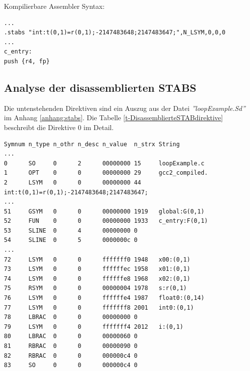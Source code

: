 Kompilierbare Assembler Syntax:
\lstset{language=plain}
\begin{lstlisting}
...
.stabs "int:t(0,1)=r(0,1);-2147483648;2147483647;",N_LSYM,0,0,0
...
c_entry:
push {r4, fp}
\end{lstlisting}


\subsection{Analyse der disassemblierten STABS}
\FloatBarrier

Die untenstehenden Direktiven sind ein Auszug aus der Datei \textit{''loopExample.Sd''} im Anhang \ref{anhang:stabs}.
Die Tabelle \ref{t-DisassemblierteSTABdirektive} beschreibt die Direktive 0 im Detail.
\lstset{language=plain}
\begin{lstlisting}
Symnum n_type n_othr n_desc n_value  n_strx String
...
0      SO     0      2      00000000 15     loopExample.c
1      OPT    0      0      00000000 29     gcc2_compiled.
2      LSYM   0      0      00000000 44     int:t(0,1)=r(0,1);-2147483648;2147483647;
...
51     GSYM   0      0      00000000 1919   global:G(0,1)
52     FUN    0      0      00000000 1933   c_entry:F(0,1)
53     SLINE  0      4      00000000 0 
54     SLINE  0      5      0000000c 0     
...
72     LSYM   0      0      fffffff0 1948   x00:(0,1)
73     LSYM   0      0      ffffffec 1958   x01:(0,1)
74     LSYM   0      0      ffffffe8 1968   x02:(0,1)
75     RSYM   0      0      00000004 1978   s:r(0,1)
76     LSYM   0      0      ffffffe4 1987   float0:(0,14)
77     LSYM   0      0      fffffff8 2001   int0:(0,1)
78     LBRAC  0      0      00000000 0      
79     LSYM   0      0      fffffff4 2012   i:(0,1)
80     LBRAC  0      0      00000060 0      
81     RBRAC  0      0      00000090 0      
82     RBRAC  0      0      000000c4 0      
83     SO     0      0      000000c4 0 
\end{lstlisting}

